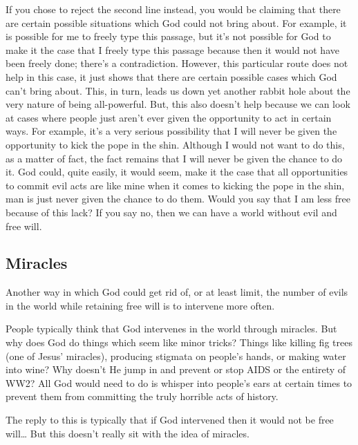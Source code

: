 If you chose to reject the second line instead, you would be claiming that there are certain possible situations which God could not bring about. For example, it is possible for me to freely type this passage, but it's not possible for God to make it the case that I freely type this passage because then it would not have been freely done; there's a contradiction. However, this particular route does not help in this case, it just shows that there are certain possible cases which God can't bring about. This, in turn, leads us down yet another rabbit hole about the very nature of being all-powerful. But, this also doesn't help because we can look at cases where people just aren't ever given the opportunity to act in certain ways. For example, it's a very serious possibility that I will never be given the opportunity to kick the pope in the shin. Although I would not want to do this, as a matter of fact, the fact remains that I will never be given the chance to do it. God could, quite easily, it would seem, make it the case that all opportunities to commit evil acts are like mine when it comes to kicking the pope in the shin, man is just never given the chance to do them. Would you say that I am less free because of this lack? If you say no, then we can have a world without evil and free will.
\subsection{Miracles}

Another way in which God could get rid of, or at least limit, the number of evils in the world while retaining free will is to intervene more often.

People typically think that God intervenes in the world through miracles. But why does God do things which seem like minor tricks? Things like killing fig trees (one of Jesus’ miracles), producing stigmata on people’s hands, or making water into wine? Why doesn’t He jump in and prevent or stop AIDS or the entirety of WW2? All God would need to do is whisper into people's ears at certain times to prevent them from committing the truly horrible acts of history.

The reply to this is typically that if God intervened then it would not be free will… But this doesn’t really sit with the idea of miracles.

